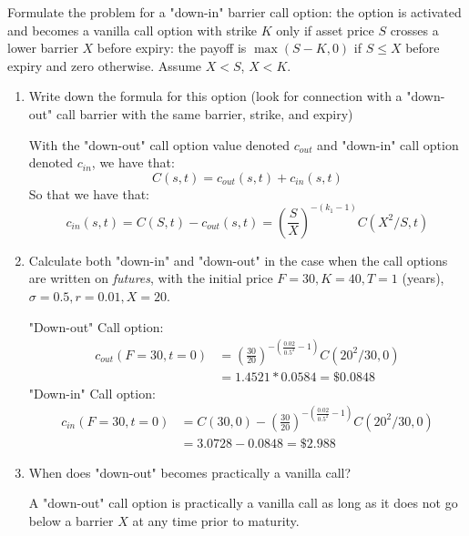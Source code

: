\documentclass[12pt,twoside, letter]{exam}
\theoremstyle{definition}
\begin{document}
\par{Formulate the problem for a "down-in" barrier call option: the option is activated and becomes a vanilla call option with strike $K$
only if asset price $S$ crosses a lower barrier $X$ before expiry: the payoff is $\max{(S-K, 0)}$ if $S \leq X$ before expiry and zero otherwise.
Assume $X < S$, $X < K$.

\begin{enumerate}
  \item Write down the formula for this option (look for connection with a "down-out" call barrier with the same barrier, strike, and expiry)
    \begin{solution}
      With the "down-out" call option value denoted $c_{out}$ and "down-in" call option denoted $c_{in}$, we have that:
      \begin{equation*}
        C(s,t) = c_{out}(s,t) + c_{in}(s,t)
      \end{equation*}
      So that we have that:
      \begin{equation*}
        c_{in}(s,t) = C(S,t) - c_{out}(s,t) =  (\frac{S}{X})^{-(k_1 - 1)} C(X^2/S,t)
      \end{equation*}
    \end{solution}
  \item Calculate both "down-in" and "down-out" in the case when the call options are written on \textit{futures}, with the initial price $F = 30,
    K = 40, T = 1$ (years), $\sigma = 0.5, r = 0.01, X = 20$.
      \begin{solution}
        "Down-out" Call option:
        \begin{align*}
          c_{out}(F = 30, t = 0) &= (\frac{30}{20})^{-(\frac{0.02}{0.5^2} - 1)} C(20^2/30,0) \\
          &=  1.4521*0.0584 = \$ 0.0848
        \end{align*}
        "Down-in" Call option:
        \begin{align*}
          c_{in}(F = 30, t = 0) &= C(30, 0)- (\frac{30}{20})^{-(\frac{0.02}{0.5^2} - 1)} C(20^2/30,0) \\
          &= 3.0728 - 0.0848 = \$ 2.988
        \end{align*}
      \end{solution}
  \item When does "down-out" becomes practically a vanilla call?
    \begin{solution}
      A "down-out" call option is practically a vanilla call as long as it does not go below a barrier $X$ at any time prior to maturity.
    \end{solution}
\end{enumerate}


}
\end{document}
